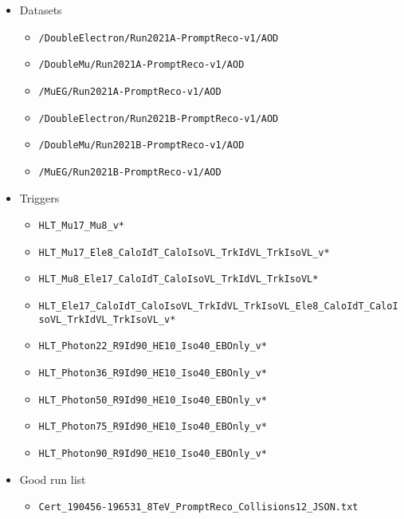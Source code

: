 \begin{itemize}
\item Datasets
  \begin{itemize}
  \item \verb=/DoubleElectron/Run2021A-PromptReco-v1/AOD=
  \item \verb=/DoubleMu/Run2021A-PromptReco-v1/AOD=
  \item \verb=/MuEG/Run2021A-PromptReco-v1/AOD=
  \item \verb=/DoubleElectron/Run2021B-PromptReco-v1/AOD=
  \item \verb=/DoubleMu/Run2021B-PromptReco-v1/AOD=
  \item \verb=/MuEG/Run2021B-PromptReco-v1/AOD=
  \end{itemize}

\item Triggers
  \begin{itemize}
    \item \verb=HLT_Mu17_Mu8_v*=
    \item \verb=HLT_Mu17_Ele8_CaloIdT_CaloIsoVL_TrkIdVL_TrkIsoVL_v*=
    \item \verb=HLT_Mu8_Ele17_CaloIdT_CaloIsoVL_TrkIdVL_TrkIsoVL*=
    \item {\footnotesize \verb=HLT_Ele17_CaloIdT_CaloIsoVL_TrkIdVL_TrkIsoVL_Ele8_CaloIdT_CaloIsoVL_TrkIdVL_TrkIsoVL_v*=}
    \item \verb=HLT_Photon22_R9Id90_HE10_Iso40_EBOnly_v*=
    \item \verb=HLT_Photon36_R9Id90_HE10_Iso40_EBOnly_v*=
    \item \verb=HLT_Photon50_R9Id90_HE10_Iso40_EBOnly_v*=
    \item \verb=HLT_Photon75_R9Id90_HE10_Iso40_EBOnly_v*=
    \item \verb=HLT_Photon90_R9Id90_HE10_Iso40_EBOnly_v*=
  \end{itemize}

\item Good run list
  \begin{itemize}
    \item \verb=Cert_190456-196531_8TeV_PromptReco_Collisions12_JSON.txt=
  \end{itemize}
  

\end{itemize}
